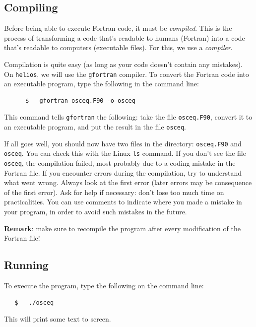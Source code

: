 \documentclass[a4paper]{article}
\begin{document}
\subsection{Compiling\label{sec:compile}}
%
\par
Before being able to execute Fortran code, it must be \emph{compiled}. This is the process of transforming a code that's readable to humans (Fortran) into a code that's readable to computers (executable files). For this, we use a \emph{compiler}.
%
\par
Compilation is quite easy (as long as your code doesn't contain any mistakes). On \texttt{helios}, we will use the \texttt{gfortran} compiler. To convert the Fortran code into an executable program, type the following in the command line:
%
\begin{verbatim}
	  $   gfortran osceq.F90 -o osceq
\end{verbatim}
%
This command tells \verb+gfortran+ the following: take the file \verb+osceq.F90+, convert it to an executable program, and put the result in the file \verb+osceq+.
%
\par
If all goes well, you should now have two files in the directory: \verb+osceq.F90+ and \verb+osceq+. You can check this with the Linux \verb+ls+ command. If you don't see the file \verb+osceq+, the compilation failed, most probably due to a coding mistake in the Fortran file. If you encounter errors during the compilation, try to understand what went wrong. Always look at the first error (later errors may be consequence of the first error). Ask for help if necessary: don't lose too much time on practicalities. You can use comments to indicate where you made a mistake in your program, in order to avoid such mistakes in the future.
%
\par
\textbf{Remark}: make sure to recompile the program after every modification of the Fortran file!
%
\subsection{Running\label{sec:run}}
%
\par
To execute the program, type the following on the command line:
%
\begin{verbatim}
   $   ./osceq
\end{verbatim}
%
This will print some text to screen.
%
\end{document}
